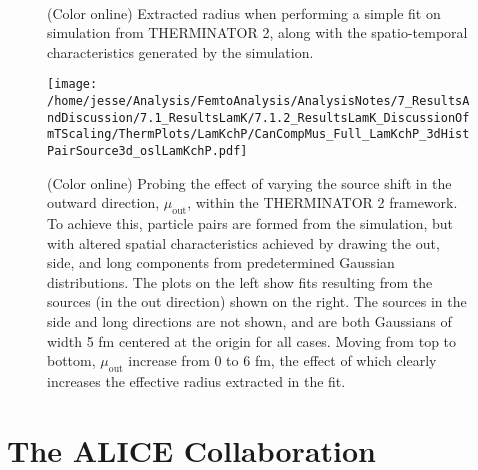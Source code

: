 \documentclass[ALICE,manyauthors]{cernphprep}
\begin{document}
\begin{figure}[h!]
  \centering
   \\
  \caption[Extracted Radius and Pair Sources from THERMINATOR 2]
  {
  (Color online) Extracted radius when performing a simple fit on simulation from THERMINATOR 2, along with the spatio-temporal characteristics generated by the simulation.
  }
  \label{fig:LamKchP_StdThermSources}
\end{figure}



\begin{figure}[h]
  \centering
  \texttt{[image: /home/jesse/Analysis/FemtoAnalysis/AnalysisNotes/7\_ResultsAndDiscussion/7.1\_ResultsLamK/7.1.2\_ResultsLamK\_DiscussionOfmTScaling/ThermPlots/LamKchP/CanCompMus\_Full\_LamKchP\_3dHistPairSource3d\_oslLamKchP.pdf]}
  \caption[Varying $\mu_{\mathrm{Out}}$ with THERMINATOR 2]
  {
  (Color online) Probing the effect of varying the source shift in the outward direction, $\mu_{\mathrm{out}}$, within the THERMINATOR 2 framework.  
  To achieve this, particle pairs are formed from the simulation, but with altered spatial characteristics achieved by drawing the out, side, and long components from predetermined Gaussian distributions.  
  The plots on the left show fits resulting from the sources (in the out direction) shown on the right.  
  The sources in the side and long directions are not shown, and are both Gaussians of width 5 fm centered at the origin for all cases.  
  Moving from top to bottom, $\mu_{\mathrm{out}}$ increase from 0 to 6 fm, the effect of which clearly increases the effective radius extracted in the fit.
  }
  \label{fig:LamKchP_ThermSources_VaryMuOut}
\end{figure}

\clearpage



\section{The ALICE Collaboration}
\label{app:collab}
\end{document}

